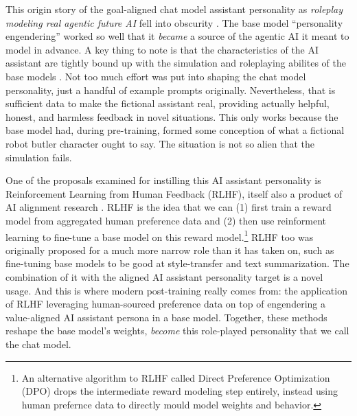 This origin story of the goal-aligned chat model assistant personality as
\emph{roleplay modeling real agentic future AI} fell into obscurity
\cite{nostalgebraist2025void}. The base model ``personality engendering''
worked so well that it \emph{became} a source of the agentic AI it meant to
model in advance. A key thing to note is that the characteristics of the AI
assistant are tightly bound up with the simulation and roleplaying abilites of
the base models \cite{nostalgebraist2025void}. Not too much effort was put into
shaping the chat model personality, just a handful of example prompts
originally. Nevertheless, that is sufficient data to make the fictional
assistant real, providing actually helpful, honest, and harmless feedback in
novel situations. This only works because the base model had, during
pre-training, formed some conception of what a fictional robot butler character
ought to say. The situation is not so alien that the simulation fails.

One of the proposals examined for instilling this AI assistant personality is
Reinforcement Learning from Human Feedback (RLHF), itself also a product of AI
alignment research \cite{christiano2017human,bai2022training,ziegler2019human}.
RLHF is the idea that we can (1) first train a reward model from aggregated
human preference data and (2) then use reinforment learning to fine-tune a base
model on this reward model.\footnote{An alternative algorithm to RLHF called
Direct Preference Optimization (DPO) \cite{rafailov2024dpo} drops the
intermediate reward modeling step entirely, instead using human prefernce data
to directly mould model weights and behavior.} RLHF too was originally proposed
for a much more narrow role than it has taken on, such as fine-tuning base
models to be good at style-transfer and text summarization. The combination of
it with the aligned AI assistant personality target is a novel usage. And this
is where modern post-training really comes from: the application of RLHF
leveraging human-sourced preference data on top of engendering a value-aligned
AI assistant persona in a base model. Together, these methods reshape the base
model's weights, \emph{become} this role-played personality that we call the
chat model.

